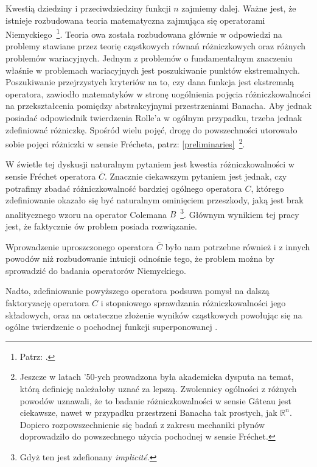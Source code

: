 Kwestią dziedziny i przeciwdziedziny funkcji $n$ zajmiemy dalej. Ważne jest, że istnieje rozbudowana teoria matematyczna zajmująca się operatorami Niemyckiego~\footnote{Patrz: \citet{Appell,Granas_FPT,Goebel,Lanza1,Lanza2, Nugari1}.}. Teoria owa została rozbudowana głównie w odpowiedzi na problemy stawiane przez teorię cząstkowych równań różniczkowych oraz różnych problemów wariacyjnych. Jednym z problemów o fundamentalnym znaczeniu właśnie w problemach wariacyjnych jest poszukiwanie punktów ekstremalnych. Poszukiwanie przejrzystych kryteriów na to, czy dana funkcja jest ekstremalą operatora, zawiodło matematyków w stronę uogólnienia pojęcia różniczkowalności na przekształcenia pomiędzy abstrakcyjnymi przestrzeniami Banacha. Aby jednak posiadać odpowiednik twierdzenia Rolle'a w ogólnym przypadku, trzeba jednak zdefiniować różniczkę. Spośród wielu pojęć, drogę do powszechności utorowało sobie pojęci różniczki w sensie Fr\' echeta, patrz: \ref{preliminaries}~\footnote{Jeszcze w latach '50-ych prowadzona była akademicka dysputa na temat, którą definicję należałoby uznać za lepszą. Zwolennicy ogólności z różnych powodów uznawali, że to badanie różniczkowalności w sensie G\^ateau jest ciekawsze, nawet w przypadku przestrzeni Banacha tak prostych, jak $\mathbb{R}^n$. Dopiero rozpowszechnienie się badań z zakresu mechaniki płynów doprowadziło do powszechnego użycia pochodnej w sensie Fr\' echet.}.  


	W świetle tej dyskusji naturalnym pytaniem jest kwestia różniczkowalności w sensie Fr\' echet operatora $\overline{C}$. Znacznie ciekawszym pytaniem jest jednak, czy potrafimy zbadać różniczkowalność bardziej ogólnego operatora $C$, którego zdefiniowanie okazało się być naturalnym ominięciem przeszkody, jaką jest brak analitycznego wzoru na operator Colemana $B$~\footnote{Gdyż ten jest zdefionany {\it implicit\'e}.}. Głównym wynikiem tej pracy jest, że faktycznie ów problem posiada rozwiązanie. 

Wprowadzenie uproszczonego operatora $\overline{C}$ było nam potrzebne również i z innych powodów niż rozbudowanie intuicji odnośnie tego, że problem można by sprowadzić do badania operatorów Niemyckiego. 

Nadto, zdefiniowanie powyższego operatora podsuwa pomysł na dalszą faktoryzację operatora $C$ i stopniowego sprawdzania różniczkowalności jego składowych, oraz na ostateczne złożenie wyników cząstkowych powołując się na ogólne twierdzenie o pochodnej funkcji superponowanej \citet[][twr. VII.4.2, str. 152]{Maurin}.


